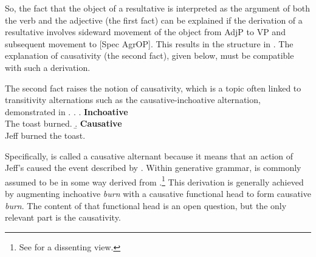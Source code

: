 \documentclass[MilwayThesis]{subfiles}
\begin{document}
So, the fact that the object of a resultative is interpreted as the argument of both the verb and the adjective (the first fact) can be explained if the derivation of a resultative involves sideward movement of the object from AdjP to VP and subsequent movement to [Spec AgrOP].
This results in the structure in \Last.
The explanation of causativity (the second fact), given below, must be compatible with such a derivation.


The second fact raises the notion of causativity, which is a topic often linked to transitivity alternations such as the causative-inchoative alternation, demonstrated in \Next.
\ex.
\a. \textbf{Inchoative}\\
The toast burned.
\b. \textbf{Causative}\\
Jeff burned the toast.

Specifically, \Last[b] is called a causative alternant because it means that an action of Jeff's caused the event described by \Last[b].
Within generative grammar, \Last[b] is commonly assumed to be in some way derived from \Last[a].\footnote{
  See \textcite{fodor1970three} for a dissenting view.
}
This derivation is generally achieved by augmenting inchoative \textit{burn} with a causative functional head to form causative \textit{burn}.
The content of that functional head is an open question, but the only relevant part is the causativity.
\end{document}
